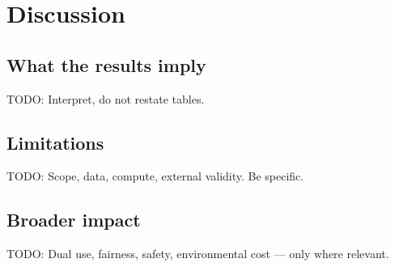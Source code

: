 \section{Discussion}
\label{sec:discussion}

\subsection{What the results imply}
TODO: Interpret, do not restate tables.

\subsection{Limitations}
TODO: Scope, data, compute, external validity. Be specific.

\subsection{Broader impact}
TODO: Dual use, fairness, safety, environmental cost — only where relevant.
